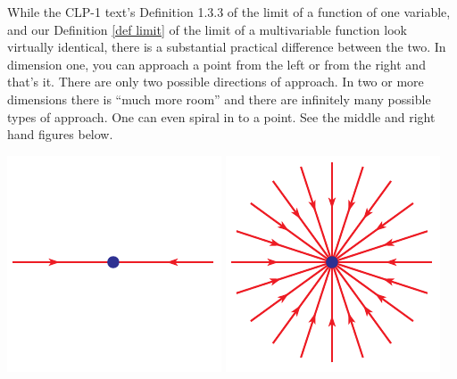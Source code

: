 While the CLP-1 text's Definition 1.3.3 of the limit of a function 
of one variable, and our Definition \ref{def limit} of the limit 
of a multivariable function look virtually identical, there is a 
substantial practical difference between the two. In dimension one, you
can approach a point from the left or from the right and that's it.
There are only two possible directions of approach. In two or more dimensions
there is ``much more room'' and there are infinitely many possible 
types of approach.  One can even spiral in to a point. See the 
middle and right hand figures below.
\begin{wfig}
\begin{center}
   \includegraphics{room1.pdf}\qquad
   \includegraphics{room2.pdf}\qquad
\end{center}
\end{wfig}

